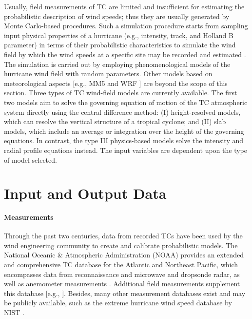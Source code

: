 Usually, field measurements of TC are limited and insufficient for estimating the probabilistic description of wind speeds; thus they are usually generated by Monte Carlo-based procedures. Such a simulation procedure starts from sampling input physical properties of a hurricane (e.g., intensity, track, and Holland B parameter) in terms of their probabilistic characteristics to simulate the wind field by which the wind speeds at a specific site may be recorded and estimated \citep{russell1971probability}. The simulation is carried out by employing phenomenological models of the hurricane wind field with random parameters. Other models based on meteorological aspects [e.g., MM5 \citep{liu1997multiscale} and WRF \citep{davis2008prediction}] are beyond the scope of this section. Three types of TC wind-field models are currently available. The first two models aim to solve the governing equation of motion of the TC atmospheric system directly using the central difference method: (I) height-resolved models, which can resolve the vertical structure of a tropical cyclone; and (II) slab models, which include an average or integration over the height of the governing equations. In contrast, the type III physics-based models solve the intensity and radial profile equations instead. The input variables are dependent upon the type of model selected.

\section{Input and Output Data}
\label{sec:storm_wind_io}

\paragraph{Measurements} Through the past two centuries, data from recorded TCs have been used by the wind engineering community to create and calibrate probabilistic models. The National Oceanic \& Atmospheric Administration (NOAA) provides an extended and comprehensive TC database for the Atlantic and Northeast Pacific, which encompasses data from reconnaissance and microwave and dropsonde radar, as well as anemometer measurements \citep{data2018}. Additional field measurements supplement this database [e.g., \citep{li2015comparative, wang2016measurements}]. Besides, many other measurement databases exist and may be publicly available, such as the extreme hurricane wind speed database by NIST \citep{batts1980hurricane}.

